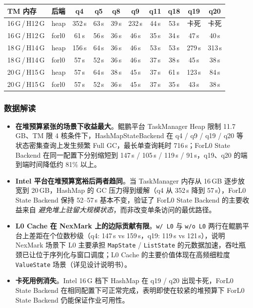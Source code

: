 \documentclass[a4paper,11pt]{article}
\newcommand{\project}{ForL0 State Backend}
\begin{document}
\begin{table}[H]
\centering
\footnotesize
\setlength{\tabcolsep}{3.5pt}
\begin{tabular}{@{}ll cccccccc@{}}
\toprule
\textbf{TM 内存} & \textbf{后端} & \textbf{q4} & \textbf{q5} & \textbf{q8} & \textbf{q9} & \textbf{q11} & \textbf{q18} & \textbf{q19} & \textbf{q20} \\
\midrule
16\,G\,/\,H12\,G & heap  & 352\,s & 63\,s & 39\,s & 232\,s & 44\,s & 53\,s & 卡死 & 卡死 \\
16\,G\,/\,H12\,G & forl0 & 61\,s  & 56\,s & 36\,s & 46\,s  & 35\,s & 34\,s & 47\,s & 40\,s \\
\midrule
18\,G\,/\,H14\,G & heap  & 156\,s & 64\,s & 36\,s & 46\,s & 53\,s & 53\,s & 279\,s & 313\,s \\
18\,G\,/\,H14\,G & forl0 & 57\,s  & 52\,s & 36\,s & 46\,s & 37\,s & 38\,s & 45\,s  & 38\,s \\
\midrule
20\,G\,/\,H15\,G & heap  & 57\,s  & 64\,s & 38\,s & 45\,s & 37\,s & 61\,s & 123\,s & 84\,s \\
20\,G\,/\,H15\,G & forl0 & 57\,s  & 52\,s & 36\,s & 45\,s & 37\,s & 35\,s & 43\,s  & 38\,s \\
\bottomrule
\end{tabular}
\end{table}

\subsubsection{数据解读}

\begin{itemize}
  \item \textbf{在堆预算紧张的场景下收益最大}。鲲鹏平台 TaskManager Heap 限制 11.7\,GB、TM 限 4 核条件下，HashMapStateBackend 在 q4 / q9 / q19 / q20 等状态密集查询上发生频繁 Full GC，最长单查询耗时 716\,s；\project{} 在同一配置下分别缩短到 147\,s / 105\,s / 119\,s / 91\,s，q19、q20 的端到端时间降低约 81\% 以上。
  \item \textbf{Intel 平台在堆预算宽裕后两者趋同}。当 TaskManager 内存从 16\,GB 逐步放宽到 20\,GB，HashMap 的 GC 压力得到缓解（q4 从 352\,s 降到 57\,s），\project{} 保持 52--57\,s 基本不变，验证了 \project{} 的主要收益来自 \emph{避免堆上驻留大规模状态}，而非改变单条访问的最优路径。
  \item \textbf{L0 Cache 在 NexMark 上的边际贡献有限}。\texttt{w/ L0} 与 \texttt{w/o L0} 两行在鲲鹏平台上差距在个位数秒级（q4: 147\,s vs 159\,s，q19: 119\,s vs 121\,s），说明 NexMark 场景下 L0 主要承担 \texttt{MapState} / \texttt{ListState} 的元数据加速，吞吐瓶颈已让位于序列化与窗口调度；L0 Cache 的主要价值体现在高频细粒度 \texttt{ValueState} 场景（详见设计说明书）。
  \item \textbf{卡死用例消失}。Intel 16\,G 档下 HashMap 在 q19 / q20 出现卡死，\project{} 在相同配置下可正常完成，表明即使在较紧的堆预算下 \project{} 仍能保证作业可用性。
\end{itemize}
\end{document}
